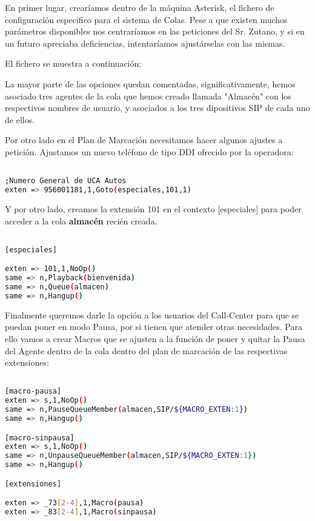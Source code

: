 En primer lugar, crearíamos dentro de la máquina Asterisk, el fichero de configuración especifico para el sistema de Colas. Pese a que existen muchos parámetros disponibles nos centraríamos en las peticiones del Sr. Zutano, y si en un futuro apreciaba deficiencias, intentaríamos ajustárselas con las mismas.

El fichero se muestra a continuación:



La mayor parte de las opciones quedan comentadas, significativamente, hemos asociado tres agentes de la cola que hemos creado llamada "Almacén" con los respectivos nombres de usuario, y asociados a los tres dipositivos SIP de cada uno de ellos.

Por otro lado en el Plan de Marcación necesitamos hacer algunos ajustes a petición. Ajustamos un nuevo teléfono de tipo DDI ofrecido por la operadora:

\begin{lstlisting}[language=bash,title={/etc/asterisk/extensions.conf}]

;Numero General de UCA Autos
exten => 956001181,1,Goto(especiales,101,1)

\end{lstlisting}

Y por otro lado, creamos la extensión 101 en el contexto [especiales] para poder acceder a la cola \textbf{almacén} recién creada.

\begin{lstlisting}[language=bash,title={/etc/asterisk/extensions.conf}]

[especiales]

exten => 101,1,NoOp()
same => n,Playback(bienvenida)
same => n,Queue(almacen)
same => n,Hangup()

\end{lstlisting}

Finalmente queremos darle la opción a los usuarios del Call-Center para que se puedan poner en modo Pausa, por si tienen que atender otras necesidades.
Para ello vamos a crear Macros que se ajusten a la función de poner y quitar la Pausa del Agente dentro de la cola dentro del plan de marcación de las respectivas extensiones:

\begin{lstlisting}[language=bash,title={/etc/asterisk/extensions.conf}]

[macro-pausa]
exten => s,1,NoOp()
same => n,PauseQueueMember(almacen,SIP/${MACRO_EXTEN:1})
same => n,Hangup()

[macro-sinpausa]
exten => s,1,NoOp()
same => n,UnpauseQueueMember(almacen,SIP/${MACRO_EXTEN:1})
same => n,Hangup()

[extensiones]

exten => _73[2-4],1,Macro(pausa)
exten => _83[2-4],1,Macro(sinpausa)

\end{lstlisting}

